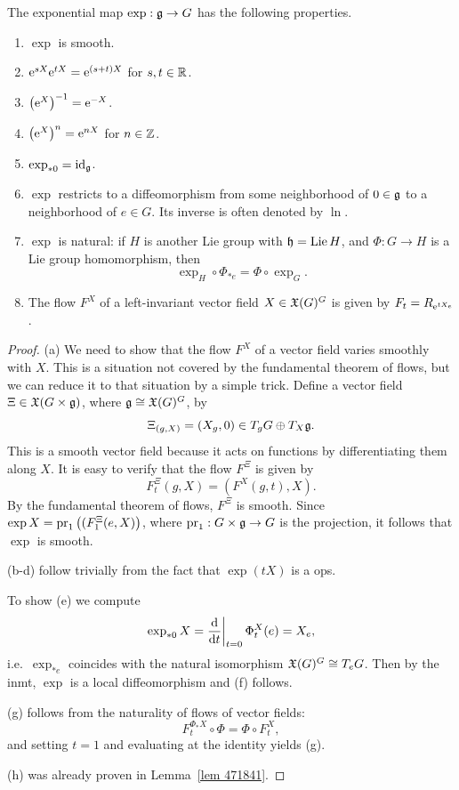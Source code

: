 \begin{prop}\label{prop properties of exp} The exponential map $\exp:\mathfrak{g}\to G$ has the following properties.
\begin{enumerate}[label=(\alph*)]
    \item $\exp$ is smooth.
    \item $\mathrm{e}^{sX}\mathrm{e}^{tX}=\mathrm{e}^{(s+t)X}$ for $s,t\in\mathbb{R}$.
    \item $\left(\mathrm{e}^X\right)^{-1}=\mathrm{e}^{-X}$.
    \item $\left(\mathrm{e}^X\right)^{n}=\mathrm{e}^{nX}$ for $n\in \mathbb{Z}$.
    \item $\exp_{\ast 0}=\operatorname{id}_{\mathfrak{g}}$.
    \item $\exp$ restricts to a diffeomorphism from some neighborhood of $0\in \mathfrak{g}$ to a neighborhood of $e\in G$. Its inverse is often denoted by $\ln$.
    \item $\exp$ is natural: if $H$ is another Lie group with $\mathfrak{h}=\operatorname{Lie} H$, and $\Phi:G\to H$ is a Lie group homomorphism, then 
    \[\exp_H\circ\Phi_{\ast e}=\Phi\circ \exp_G.\]
    \item The flow $F^X$ of a left-invariant vector field $X\in \mathfrak{X}(G)^G$ is given by $F_t=R_{\mathrm{e}^{tX_e}}$.
\end{enumerate}
\end{prop}
\begin{proof}
    (a) We need to show that the flow $F^X$ of a vector field varies smoothly with $X$. This is a situation not covered by the fundamental theorem of flows, but we can reduce it to that situation by a simple trick. Define a vector field $\Xi\in\mathfrak{X}(G\times\mathfrak{g})$, where $\mathfrak{g}\cong \mathfrak{X}(G)^G$, by
    \[\Xi_{(g,X)}=(X_g,0)\in T_gG\oplus T_X \mathfrak{g}.\]
    This is a smooth vector field because it acts on functions by differentiating them along $X$. It is easy to verify that the flow $F^\Xi$ is given by
    \[F^\Xi_t(g,X)=\left(F^X(g,t),X\right).\]
    By the fundamental theorem of flows, $F^\Xi$ is smooth. Since $\exp X=\operatorname{pr}_1\left((F^\Xi_1(e,X)\right)$, where $\operatorname{pr}_1:G\times\mathfrak{g}\to G$ is the projection, it follows that $\exp$ is smooth.

    (b-d) follow trivially from the fact that $\exp(tX)$ is a \gls{ops}.
    
    To show (e) we compute
    \[\exp_{\ast 0}X=\restr{\frac{\dd}{\dd t}}{t=0}\Phi_t^X(e)=X_e,\]
    i.e.~$\exp_{\ast e}$ coincides with the natural isomorphism $\mathfrak{X}(G)^G\cong T_e G$. Then by the \gls{inmt}, $\exp$ is a local diffeomorphism and (f) follows.

    (g) follows from the naturality of flows of vector fields:
    \[F^{\Phi_\ast X}_t\circ \Phi=\Phi\circ F^X_t,\]
    and setting $t=1$ and evaluating at the identity yields (g).

    (h) was already proven in Lemma~\ref{lem 471841}.
\end{proof}

